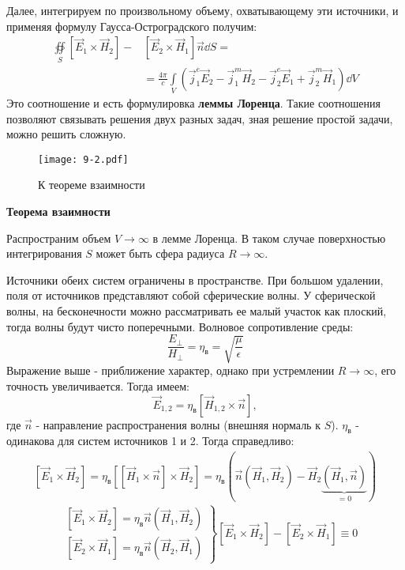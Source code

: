 Далее, интегрируем по произвольному объему, охватывающему эти источники, и применяя формулу Гаусса-Остроградского
получим:
\begin{align*}
	\oiint \limits_S \left[\vec{E}_1 \times \vec{H}_2 \right] - &\left[ \vec{E}_2 \times \vec{H}_1\right] \vec{n} \dd S =\\
	&=\frac{4 \pi}{c} \int \limits_V \left( \vec{j}^{e}_1 \vec{E}_2-\vec{j}^{m}_1 \vec{H}_2-\vec{j}^{e}_2 \vec{E}_1+\vec{j}^{m}_2 \vec{H}_1 \right) \dd V
\end{align*}
Это соотношение и есть формулировка \textbf{леммы Лоренца}. Такие соотношения позволяют связывать решения двух разных
задач, зная решение простой задачи, можно решить сложную.

\begin{figure}[h!]
	\centering
	\texttt{[image: 9-2.pdf]}
	\caption{К теореме взаимности}
\end{figure}
\textbf{Теорема взаимности}

Распространим объем $V\to\infty$ в лемме Лоренца. В таком случае поверхностью интегрирования $S$ может быть сфера
радиуса $R\to\infty$.

Источники обеих систем ограничены в пространстве. При большом удалении, поля от источников представляют собой
сферические волны. У сферической волны, на бесконечности можно рассматривать ее малый участок как плоский, тогда волны
будут чисто поперечными. Волновое сопротивление среды:
\begin{equation}
	\frac{E_{\perp}}{H_{\perp}} = \eta_{\text{в}} = \sqrt{\frac{\mu}{\epsilon}}	
\end{equation} 
Выражение выше - приближение характер, однако при устремлении $R\to\infty$, его точность увеличивается. Тогда имеем:
\begin{equation}
	\vec{E}_{1,2} = \eta_{\text{в}} \left[\vec{H}_{1,2} \times \vec{n}\right]	,
\end{equation}
где $\vec{n}$ - направление распространения волны (внешняя нормаль к $S$). $\eta_{\text{в}}$ - одинакова для систем
источников 1 и 2. Тогда справедливо:
\begin{align*}
	\left[\vec{E}_{1} \times \vec{H}_2 \right] = \eta_{\text{в}} \left[ \left[\vec{H}_{1} \times \vec{n}\right]\times \vec{H}_2\right] = \eta_{\text{в}} \left(\vec{n}(\vec{H}_1,\vec{H}_2) - \vec{H}_2\underbrace{(\vec{H}_1,\vec{n})}_{=0}\right) 
\end{align*}
\begin{equation}
	\left.
	\begin{aligned}
		&\left[\vec{E}_{1} \times \vec{H}_2 \right] = \eta_{\text{в}} \vec{n} (\vec{H}_1,\vec{H}_2)\\
		&\left[\vec{E}_{2} \times \vec{H}_1 \right] = \eta_{\text{в}} \vec{n} (\vec{H}_2,\vec{H}_1)
	\end{aligned}
	\right\} \left[\vec{E}_{1} \times \vec{H}_2 \right] - \left[\vec{E}_{2} \times \vec{H}_1 \right] \equiv 0
\end{equation}

